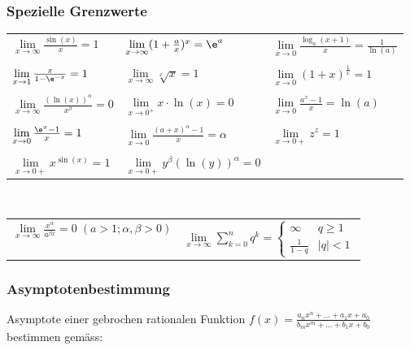 \subsubsection{Spezielle Grenzwerte}	
    \begin{tabular}{lll}
        $\lim\limits_{x \to \infty} \frac{\sin(x)}{x} = 1$ &  $\lim\limits_{x \to \infty} (1 + \frac{a}{x})^x = \e^a$ & $\lim\limits_{x \to 0} \frac{\log_a(x+1)}{x} = \frac{1}{\ln(a)}$  \\
        \\
        $\lim\limits_{x \to 1} \frac{x}{1-\e^{-x}} = 1$ & $\lim\limits_{x \to \infty} \sqrt[x]{x} = 1$  & $\lim\limits_{x \to 0} (1+x)^{\frac{1}{x}} = 1$ \\
        \\
        $\lim\limits_{x \to \infty} \frac{(\ln(x))^\alpha}{x^\beta} = 0$ & $\lim\limits_{x \to 0^+} x \cdot \ln(x) = 0$  & $\lim\limits_{x \to 0} \frac{a^x -1}{x} = \ln(a)$ \\
        \\
        $\lim\limits_{x \to 0} \frac{\e^x - 1}{x} = 1$ & $\lim\limits_{x \to 0} \frac{(a+x)^\alpha -1}{x} = \alpha$  & $\lim\limits_{x \to 0+} z^z = 1$ \\
        \\
        $\lim\limits_{x \to 0+} x^{\sin(x)} = 1$ & $\lim\limits_{x \to 0+} y^{\beta} (\ln(y))^{\alpha} = 0 $ &  \\
    \end{tabular}
    \\
    \begin{tabular}{ll}
        $\lim\limits_{x \to \infty} \frac{x^\alpha}{a^{\beta x}} = 0 \; (a > 1; \alpha, \beta > 0)$  & $\lim\limits_{x \to \infty} \sum\limits _{k=0}^n q^k = 
            \begin{cases}			
                \infty & q \geq 1 \\
                \frac{1}{1-q} & \vert q \vert < 1
            \end{cases} $ \\ 
    \end{tabular}

\subsubsection{Asymptotenbestimmung}
    Asymptote einer gebrochen rationalen Funktion $f(x) = \frac{a_nx^n + ... + a_1x + a_0}{b_mx^m + ... + b_1x + b_0}$\\
    bestimmen gemäss:
    
